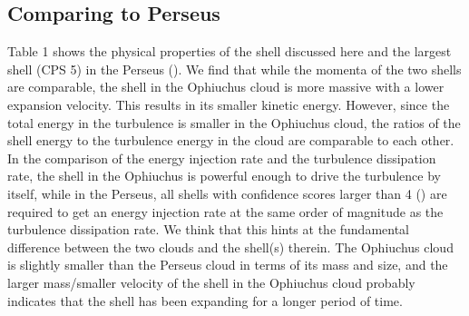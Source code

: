 \documentclass[11pt,a4paper]{emulateapj}
\begin{document}
\subsection{Comparing to Perseus}
Table 1 shows the physical properties of the shell discussed here and the largest shell (CPS 5) in the Perseus (\citet{Arce_2011}). We find that while the momenta of the two shells are comparable, the shell in the Ophiuchus cloud is more massive with a lower expansion velocity. This results in its smaller kinetic energy. However, since the total energy in the turbulence is smaller in the Ophiuchus cloud, the ratios of the shell energy to the turbulence energy in the cloud are comparable to each other. In the comparison of the energy injection rate and the turbulence dissipation rate, the shell in the Ophiuchus is powerful enough to drive the turbulence by itself, while in the Perseus, all shells with confidence scores larger than 4 (\citet{Arce_2011}) are required to get an energy injection rate at the same order of magnitude as the turbulence dissipation rate. We think that this hints at the fundamental difference between the two clouds and the shell(s) therein. The Ophiuchus cloud is slightly smaller than the Perseus cloud in terms of its mass and size, and the larger mass/smaller velocity of the shell in the Ophiuchus cloud probably indicates that the shell has been expanding for a longer period of time.






\end{document}
